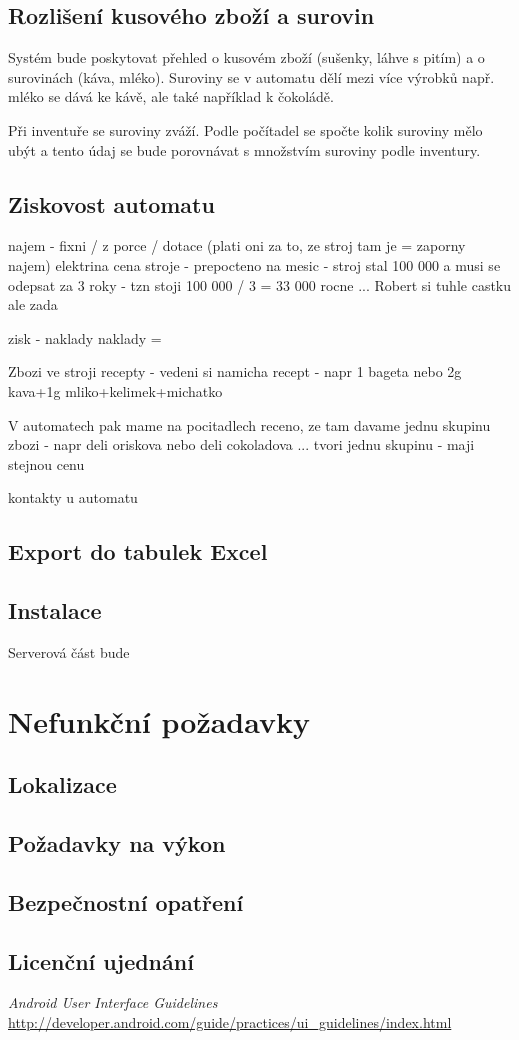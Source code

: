 \documentclass[a4paper,10pt]{article}
\begin{document}
\subsection{Rozlišení kusového zboží a surovin}
Systém bude poskytovat přehled o kusovém zboží (sušenky, láhve s pitím) a o surovinách (káva, mléko). Suroviny se v automatu dělí mezi více výrobků např. mléko se dává ke kávě, ale také například k čokoládě.

Při inventuře se suroviny zváží. Podle počítadel se spočte kolik suroviny mělo ubýt a tento údaj se bude porovnávat s množstvím suroviny podle inventury.

\subsection{Ziskovost automatu}
najem - fixni / z porce / dotace (plati oni za to, ze stroj tam je = zaporny najem)
elektrina
cena stroje - prepocteno na mesic - stroj stal 100 000 a  musi se odepsat za 3 roky - tzn stoji 100 000 / 3 = 33 000 rocne ... Robert si tuhle castku ale zada

zisk - naklady
naklady = 

Zbozi ve stroji
recepty - vedeni si namicha recept - napr 1 bageta nebo 2g kava+1g  mliko+kelimek+michatko

V automatech pak mame na pocitadlech receno, ze tam davame jednu skupinu zbozi - napr deli oriskova nebo deli cokoladova ... tvori jednu skupinu - maji stejnou cenu

kontakty u automatu


\subsection{Export do tabulek Excel}

\subsection{Instalace}
Serverová část bude 
\section{Nefunkční požadavky}
\subsection{Lokalizace}
\subsection{Požadavky na výkon}
\subsection{Bezpečnostní opatření}
\subsection{Licenční ujednání}
\begin{thebibliography}{1}
	{\em Android User Interface Guidelines}
		\url{http://developer.android.com/guide/practices/ui_guidelines/index.html}
\end{thebibliography}
\end{document}
